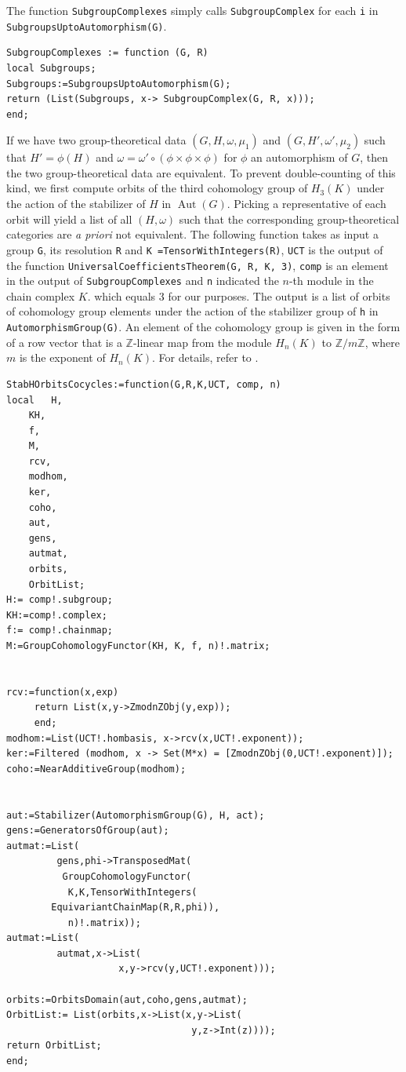 \documentclass[a4paper, 10pt]{book}
\theoremstyle{definition}
\numberwithin{equation}{chapter}
\newcommand\lstl{\lstinline}
\newcommand\Aut{\operatorname{Aut}}
\newcommand\ZZ{\mathbb Z}
\begin{document}
The function \lstl{SubgroupComplexes} simply calls \lstl{SubgroupComplex} for each \lstl{i} in \lstl{SubgroupsUptoAutomorphism(G)}.
\begin{lstlisting}
SubgroupComplexes := function (G, R)
local Subgroups;
Subgroups:=SubgroupsUptoAutomorphism(G);
return (List(Subgroups, x-> SubgroupComplex(G, R, x)));
end;
\end{lstlisting}
If we have two group-theoretical data $(G, H, \omega, \mu_1)$ and $(G, H', \omega', \mu_2)$ such that $H' = \phi(H)$ and $\omega = \omega'\circ(\phi \times \phi \times \phi)$ for $\phi$ an automorphism of $G$, then the two group-theoretical data are equivalent.  To prevent double-counting of this kind, we first compute orbits of the  third cohomology group of $H_3(K)$ under the action of the stabilizer of $H$ in $\Aut(G)$. Picking a representative of each orbit will yield a list of all $(H,\omega)$ such that the corresponding group-theoretical categories are \textit{a priori} not equivalent. The following function takes as input a group \lstinline{G}, its resolution \lstinline{R} and \lstinline{K =TensorWithIntegers(R)}, \lstinline{UCT} is the output of the function \lstinline{UniversalCoefficientsTheorem(G, R, K, 3)}, \lstl{comp} is an element in the output of \lstl{SubgroupComplexes} and \lstl{n} indicated the $n$-th module in the chain complex $K$. which equals 3 for our purposes. The output is a list of orbits of cohomology group elements under the action of the stabilizer group of \lstinline{h} in \lstinline{AutomorphismGroup(G)}. An element of the cohomology group is given in the form of a row vector that is a $\ZZ$-linear map from the module $H_n(K)$ to $\ZZ/m\ZZ$, where $m$ is the exponent of $H_n(K)$. For details, refer to \cite{2017arXiv170806538M}. 
\begin{lstlisting}
StabHOrbitsCocycles:=function(G,R,K,UCT, comp, n)
local 	H, 
	KH, 
	f, 
	M, 
	rcv, 
	modhom, 
	ker, 
	coho,
	aut,
	gens,
	autmat,
	orbits, 
	OrbitList;
H:= comp!.subgroup;
KH:=comp!.complex;
f:= comp!.chainmap;
M:=GroupCohomologyFunctor(KH, K, f, n)!.matrix;


rcv:=function(x,exp) 
     return List(x,y->ZmodnZObj(y,exp));
     end;
modhom:=List(UCT!.hombasis, x->rcv(x,UCT!.exponent));
ker:=Filtered (modhom, x -> Set(M*x) = [ZmodnZObj(0,UCT!.exponent)]);   
coho:=NearAdditiveGroup(modhom);


aut:=Stabilizer(AutomorphismGroup(G), H, act);
gens:=GeneratorsOfGroup(aut);
autmat:=List(
         gens,phi->TransposedMat(
          GroupCohomologyFunctor(
           K,K,TensorWithIntegers(
	    EquivariantChainMap(R,R,phi)),
           n)!.matrix));
autmat:=List(
         autmat,x->List(
                    x,y->rcv(y,UCT!.exponent)));
                  
orbits:=OrbitsDomain(aut,coho,gens,autmat);
OrbitList:= List(orbits,x->List(x,y->List(
                                 y,z->Int(z))));
return OrbitList; 
end;

\end{lstlisting}
\end{document}
